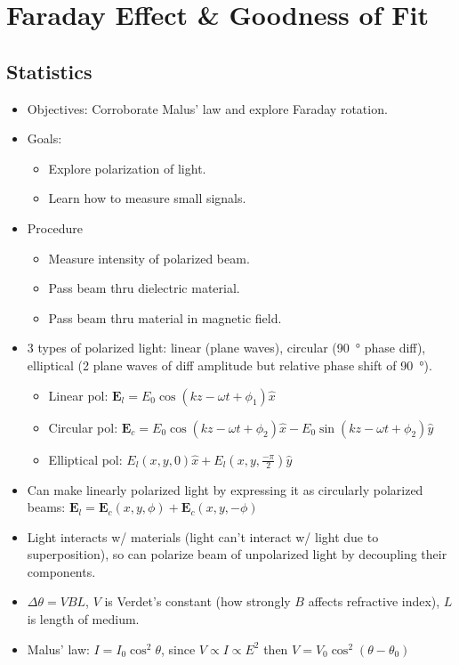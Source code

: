 \documentclass[twocolumn]{article}
\begin{document}
\section{Faraday Effect \& Goodness of Fit}
\subsection{Statistics}
\begin{itemize}
    \item Objectives: Corroborate Malus' law and explore Faraday rotation.
    \item Goals:
    \begin{itemize}
        \item Explore polarization of light.
        \item Learn how to measure small signals.
    \end{itemize}
    \item Procedure
    \begin{itemize}
        \item Measure intensity of polarized beam.
        \item Pass beam thru dielectric material.
        \item Pass beam thru material in magnetic field.
    \end{itemize}
    \item 3 types of polarized light: linear (plane waves), circular (\SI{90}{\degree} phase diff), elliptical (2 plane waves of diff amplitude but relative phase shift of \SI{90}{\degree}).
    \begin{itemize}
        \item Linear pol: $\mathbf{E}_l = E_0 \cos(kz - \omega t + \phi_1) \hat{x}$
        \item Circular pol: $\mathbf{E}_c = E_0 \cos(kz - \omega t + \phi_2) \hat{x} - E_0 \sin(kz - \omega t + \phi_2) \hat{y}$
        \item Elliptical pol: $E_l(x, y, 0) \hat{x} + E_l(x, y, \frac{-\pi}{2}) \hat{y}$
    \end{itemize}
    \item Can make linearly polarized light by expressing it as circularly polarized beams: $\mathbf{E}_l = \mathbf{E}_c (x, y, \phi) + \mathbf{E}_c(x, y, -\phi)$
    \item Light interacts w/ materials (light can't interact w/ light due to superposition), so can polarize beam of unpolarized light by decoupling their components.
    \item $\Delta \theta = VBL$, $V$ is Verdet's constant (how strongly $B$ affects refractive index), $L$ is length of medium.
    \item Malus' law: $I = I_0 \cos^2 \theta$, since $V \propto I \propto E^2$ then $V = V_0 \cos^2(\theta - \theta_0)$
\end{itemize}
\end{document}
